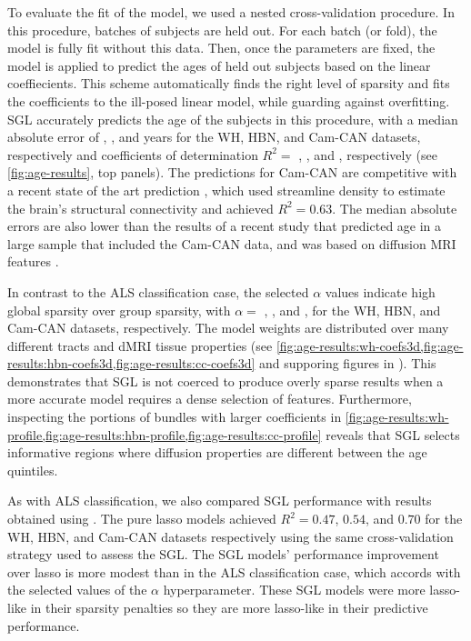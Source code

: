 \documentclass[10pt,letterpaper]{article}
\begin{document}
To evaluate the fit of the model, we used a nested cross-validation
procedure. In this procedure, batches of subjects are held out. For each
batch (or fold), the model is fully fit without this data. Then, once the
parameters are fixed, the model is applied to predict the ages of held out
subjects based on the linear coeffiecients. This scheme automatically finds
the right level of sparsity and fits the coefficients to the ill-posed linear
model, while guarding against overfitting. SGL accurately predicts the age of
the subjects in this procedure, with a median absolute error of {\whMae},
\added{{\hbnMae}}, and {\camcanMae} years for the WH, HBN, and Cam-CAN datasets,
respectively and coefficients of determination $R^2 = $ {\whRsq} , \added{{\hbnRsq}}, and {\camcanRsq},
respectively (see \cref{fig:age-results}, top panels). The
predictions for Cam-CAN are competitive with a recent state of the art
prediction \cite{mcpherson2020single}, which used streamline density to
estimate the brain's structural connectivity and achieved $R^2 = 0.63$. The
median absolute errors are also lower than the results of a recent study that
predicted age in a large sample that included the Cam-CAN data, and was based
on diffusion MRI features \cite{Richard2018-ux}.

In contrast to the ALS classification case, the selected $\alpha$ values
indicate high global sparsity over group sparsity, with $\alpha = $
{\whLRatio}, {\hbnLRatio}, and {\ccLRatio}, for the WH, HBN, and Cam-CAN
datasets, respectively. The model weights are distributed over many different
tracts and dMRI tissue properties (see
\cref{fig:age-results:wh-coefs3d,fig:age-results:hbn-coefs3d,fig:age-results:cc-coefs3d}
and supporing figures in ).
This demonstrates that SGL is not coerced to produce overly sparse results
when a more accurate model requires a dense selection of features.
Furthermore, inspecting the portions of bundles with larger coefficients in
\cref{fig:age-results:wh-profile,fig:age-results:hbn-profile,fig:age-results:cc-profile}
reveals that SGL selects informative regions where diffusion properties are
different between the age quintiles.

As with ALS classification, we also compared SGL performance with results
obtained using
.
The pure lasso models achieved $R^2 = 0.47$, $0.54$, and $0.70$ for the WH, HBN, and Cam-CAN datasets respectively using the same cross-validation strategy used to assess the SGL.
The SGL models'
performance improvement over lasso is more modest than in the ALS
classification case, which accords with the selected values of the $\alpha$
hyperparameter. These SGL models were more lasso-like in their sparsity
penalties so they are more lasso-like in their predictive performance.
\end{document}
